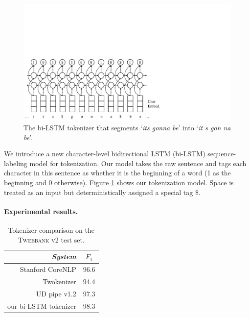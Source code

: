 \documentclass[11pt,a4paper]{article}
\begin{document}
\begin{figure}[t]
	\centering
	\includegraphics[width=\columnwidth,trim={0 0 11cm 9cm},clip]{graphics/bilstm_tokenizer}
	\caption{The bi-LSTM tokenizer that segments `{\it its gonna be}' into `{\it it s gon na be}'.}\label{fig:tok-model}
\end{figure}
We introduce a new
character-level bidirectional LSTM (bi-LSTM) sequence-labeling model
\cite{DBLP:journals/corr/HuangXY15,ma-hovy:2016:P16-1}
for tokenization.
Our model takes the raw sentence and tags each character in this 
sentence as whether it is the beginning of a word (1 as the beginning and 0 otherwise).
Figure \ref{fig:tok-model} shows our tokenization model.
Space is treated as an input but deterministically  assigned a special tag \$.

\paragraph{Experimental results.}

\begin{table}[t]
	\centering
	\begin{tabular}{rc}
		\hline
		\it System & $F_1$ \\
		\hline
		  Stanford CoreNLP & 96.6 \\
		 Twokenizer & 94.4 \\		 
		\hdashline
		UD pipe v1.2 & 97.3 \\
	 	our bi-LSTM tokenizer & 98.3 \\
		\hline
	\end{tabular}
	\caption{Tokenizer comparison on the \textsc{Tweebank v2} test set.}\label{tbl:tok-result}
\end{table}
\end{document}
